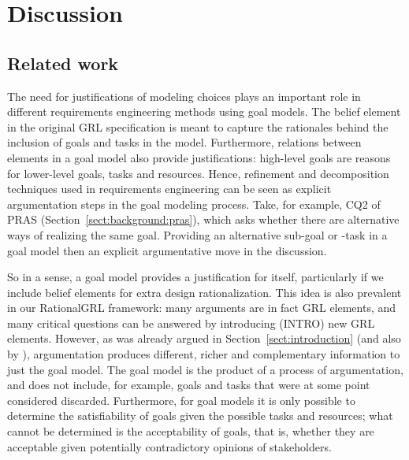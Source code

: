 \section{Discussion}
\label{sect:discussion}

\subsection{Related work}
\label{sect:goalmodeling:relatedwork}

The need for justifications of modeling choices plays an important role in different requirements engineering methods using goal models. The belief element in the original GRL specification \cite{Amyot:2010:EGM:1841349.1841356} is meant to capture the rationales behind the inclusion of goals and tasks in the model. Furthermore, relations between elements in a goal model also provide justifications: high-level goals are reasons for lower-level goals, tasks and resources. Hence, refinement and decomposition techniques used in requirements engineering \cite{van2001goal} can be seen as explicit argumentation steps in the goal modeling process. Take, for example, CQ2 of PRAS (Section~\ref{sect:background:pras}), which asks whether there are alternative ways of realizing the same goal. Providing an alternative sub-goal or -task in a goal model then an explicit argumentative move in the discussion. 

So in a sense, a goal model provides a justification for itself, particularly if we include belief elements for extra design rationalization. This idea is also prevalent in our RationalGRL framework: many arguments are in fact GRL elements, and many critical questions can be answered by introducing (\textsf{INTRO}) new GRL elements. However, as was already argued in Section~\ref{sect:introduction} (and also by \cite{Jureta:RE2008}), argumentation produces different, richer and complementary information to just the goal model. The goal model is the product of a process of argumentation, and does not include, for example, goals and tasks that were at some point considered discarded. Furthermore, for goal models it is only possible to determine the satisfiability of goals given the possible tasks and resources; what cannot be determined is the acceptability of goals, that is, whether they are acceptable given potentially contradictory opinions of stakeholders.  

